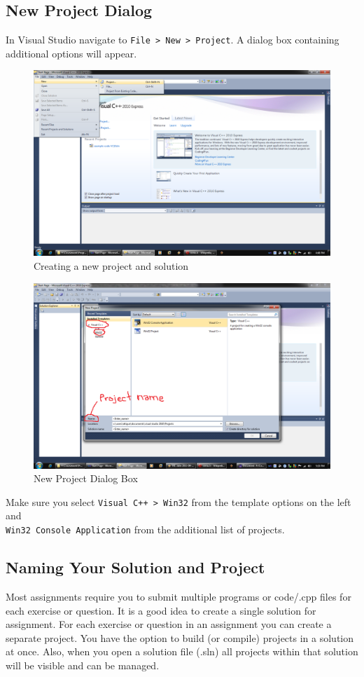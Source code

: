 \documentclass{article}
\begin{document}
\subsection{New Project Dialog}
In Visual Studio navigate to \verb|File > New > Project|. A dialog box containing additional options will appear.
\begin{figure}[H]
\centering
\includegraphics[width=\textwidth]{Create_New_Project.png}
\caption{Creating a new project and solution}
\end{figure}
\begin{figure}[H]
\centering
\includegraphics[width=\textwidth]{New_Project_Dialog.png}
\caption{New Project Dialog Box}
\end{figure}
Make sure you select \verb|Visual C++ > Win32| from the template options on the left and\\ \verb|Win32 Console Application| from the additional list of projects.

\subsection{Naming Your Solution and Project}
Most assignments require you to submit multiple programs or code/.cpp files for each exercise or question. It is a good idea to create a single solution for assignment. For each exercise or question in an assignment you can create a separate project. You have the option to build (or compile) projects in a solution at once. Also, when you open a solution file (.sln) all projects within that solution will be visible and can be managed.
\end{document}

